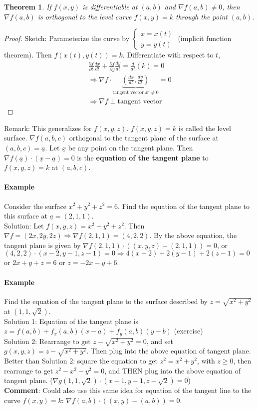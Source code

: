 \documentclass[tikz,10pt,letter]{article}
\theoremstyle{plain}
\newtheorem*{theorem*}{Theorem}
\theoremstyle{definition}
\begin{document}
\begin{theorem*}
If $f(x,y)$ is differentiable at $(a,b)$ and $\nabla f(a,b)\neq0$, then $\nabla f(a,b)$ is orthogonal to the level curve $f(x,y)=k$ through the point $(a,b)$. 
\end{theorem*}
\begin{proof}
     Sketch: Parameterize the curve by $\begin{cases}x=x(t)\\y=y(t)\end{cases}$ (implicit function theorem). Then $f(x(t),y(t))=k$. Differentiate with respect to $t$, \begin{align*}\frac{\partial f}{\partial t}\frac{dx}{dt}+\frac{\partial f}{\partial y}\frac{dy}{dt}=\frac{d}{dt}(k)=0\\\Rightarrow \nabla f\cdot\underbrace{\left(\frac{dx}{dt},\frac{dy}{dt}\right)}_{\text{tangent vector }x'\neq0}=0\\\Rightarrow \nabla f\perp\text{tangent vector}\end{align*}
\end{proof}
Remark: This generalizes for $f(x,y,z)$. $f(x,y,z)=k$ is called the level surface. $\nabla f(a,b,c)$ orthogonal to the tangent plane of the surface at $(a,b,c)=\underline{a}$. Let $\underline{x}$ be any point on the tangent plane. Then $\nabla f(\underline{a})\cdot (\underline{x}-\underline{a})=0$ is the \textbf{equation of the tangent plane} to $f(x,y,z)=k$ at $(a,b,c)$.

\paragraph{Example}
Consider the surface $x^2+y^2+z^2=6$. Find the equation of the tangent plane to this surface at $\underline{a}=(2,1,1)$. \\
Solution: Let $f(x,y,z)=x^2+y^2+z^2$. Then $\nabla f=(2x,2y,2z)\Rightarrow \nabla f(2,1,1)=(4,2,2)$. By the above equation, the tangent plane is given by $\nabla f(2,1,1)\cdot((x,y,z)-(2,1,1))=0$, or $(4,2,2)\cdot(x-2,y-1,z-1)=0\Rightarrow 4(x-2)+2(y-1)+2(z-1)=0$ or $2x+y+z=6$ or $z=-2x-y+6$. 

\paragraph{Example}
Find the equation of the tangent plane to the surface described by $z=\sqrt{x^2+y^2}$ at $(1,1,\sqrt{2})$. \\ 
Solution 1: Equation of the tangent plane is $z=f(a,b)+f_x(a,b)(x-a)+f_y(a,b)(y-b)$ (exercise) \\ 
Solution 2: Rearrange to get $z-\sqrt{x^2+y^2}=0$, and set $g(x,y,z)=z-\sqrt{x^2+y^2}$. Then plug into the above equation of tangent plane. \\ 
Better than Solution 2: square the equation to get $z^2=x^2+y^2$, with $z\geq0$, then rearrange to get $z^2-x^2-y^2=0$, and THEN plug into the above equation of tangent plane. ($\nabla g(1,1,\sqrt{2})\cdot(x-1,y-1,z-\sqrt{2})=0$)\\
\textbf{Comment}: Could also use this same idea for equation of the tangent line to the curve $f(x,y)=k$: $\nabla f(a,b)\cdot ((x,y)-(a,b))=0$. 
\end{document}
